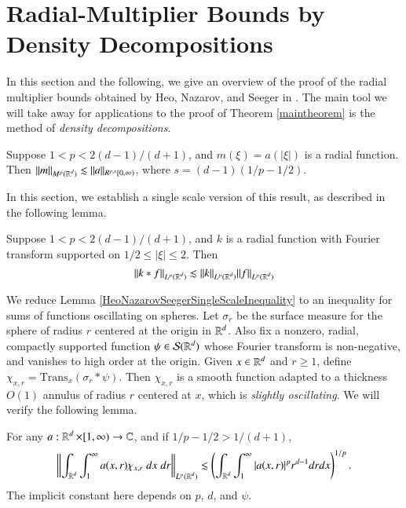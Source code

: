 \section{Radial-Multiplier Bounds by Density Decompositions}

In this section and the following, we give an overview of the proof of the radial multiplier bounds obtained by Heo, Nazarov, and Seeger in \cite{HeoandNazarovandSeeger}. The main tool we will take away for applications to the proof of Theorem \ref{maintheorem} is the method of \emph{density decompositions}.

\begin{theorem} \label{HeoNazarovSeegerTheorem}
    Suppose $1 < p < 2(d-1)/(d+1)$, and $m(\xi) = a(|\xi|)$ is a radial function. Then $\| m \|_{M^p(\operatorname{\mathbb{R}}^d)} \lesssim \| a \|_{R^{p,s}[0,\infty)}$, where $s = (d-1)(1/p - 1/2)$.
\end{theorem}

In this section, we establish a single scale version of this result, as described in the following lemma.

\begin{lemma} \label{HeoNazarovSeegerSingleScaleInequality}
  Suppose $1 < p < 2(d-1)/(d+1)$, and $k$ is a radial function with Fourier transform supported on $1/2 \leq |\xi| \leq 2$. Then
%
\begin{equation}
    \| k * f \|_{L^p(\operatorname{\mathbb{R}}^d)} \lesssim \| k \|_{L^p(\operatorname{\mathbb{R}}^d)} \| f \|_{L^p(\operatorname{\mathbb{R}}^d)}
\end{equation}
%
\end{lemma}

We reduce Lemma \eqref{HeoNazarovSeegerSingleScaleInequality} to an inequality for sums of functions oscillating on spheres. Let $\sigma_r$ be the surface measure for the sphere of radius $r$ centered at the origin in $\operatorname{\mathbb{R}}^d$. Also fix a nonzero, radial, compactly supported function $\psi \in \mathcal{S}(\operatorname{\mathbb{R}}^d)$ whose Fourier transform is non-negative, and vanishes to high order at the origin. Given $x \in \operatorname{\mathbb{R}}^d$ and $r \geq 1$, define $\chi_{x, r} = \text{Trans}_x (\sigma_r * \psi)$. Then $\chi_{x,r}$ is a smooth function adapted to a thickness $O(1)$ annulus of radius $r$ centered at $x$, which is \emph{slightly oscillating}. We will verify the following lemma.

\begin{lemma} \label{lemma1}
    For any $a : \operatorname{\mathbb{R}}^d \times [1,\infty) \to \operatorname{\mathbb{C}}$, and if $1/p - 1/2 > 1/(d+1)$,
    \[ \left\| \int_{\operatorname{\mathbb{R}}^d} \int_1^\infty a(x,r) \chi_{x, r}\; dx\; dr \right\|_{L^p(\operatorname{\mathbb{R}}^d)} \lesssim \left( \int_{\operatorname{\mathbb{R}}^d} \int_1^\infty |a(x,r)|^p r^{d-1} dr dx \right)^{1/p}. \]
    The implicit constant here depends on $p$, $d$, and $\psi$.
\end{lemma}

